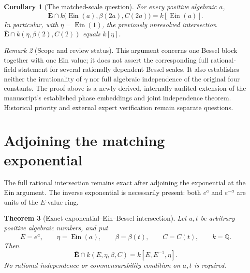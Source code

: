 \documentclass[11pt]{article}
\newtheorem{theorem}{Theorem}[section]
\newtheorem{corollary}[theorem]{Corollary}
\theoremstyle{definition}
\theoremstyle{remark}
\newtheorem{remark}[theorem]{Remark}
\newcommand{\Ein}{\operatorname{Ein}}
\begin{document}
\begin{corollary}[The matched-scale question]\label{fri:matched}
For every positive algebraic $a$,
\[
 \overline{\mathbf E}\cap
 k\bigl(\Ein(a),\beta(2a),C(2a)\bigr)=k[\Ein(a)].
\]
In particular, with $\eta=\Ein(1)$, the previously unresolved
intersection $\overline{\mathbf E}\cap k(\eta,\beta(2),C(2))$
equals $k[\eta]$.
\end{corollary}

\begin{remark}[Scope and review status]
This argument concerns one Bessel block together with one Ein value;
it does not assert the corresponding full rational-field statement
for several rationally dependent Bessel scales.  It also establishes
neither the irrationality of $\gamma$ nor full algebraic independence
of the original four constants.  The proof above is a newly derived,
internally audited extension of the manuscript's established phase
embeddings and joint independence theorem.  Historical priority and
external expert verification remain separate questions.
\end{remark}


\section{Adjoining the matching exponential}
\label{fre:section}

The full rational intersection remains exact after adjoining the
exponential at the Ein argument.  The inverse exponential is necessarily
present: both $e^a$ and $e^{-a}$ are units of the $E$-value ring.

\begin{theorem}[Exact exponential--Ein--Bessel intersection]
\label{fre:main}
Let $a,t$ be arbitrary positive algebraic numbers, and put
\[
 E=e^a,\qquad \eta=\Ein(a),\qquad
 \beta=\beta(t),\qquad C=C(t),\qquad k=\overline{\mathbb Q}.
\]
Then
\begin{equation}\label{fre:main-equation}
 \boxed{\quad
 \overline{\mathbf E}\cap k(E,\eta,\beta,C)
       =k[E,E^{-1},\eta].
 \quad}
\end{equation}
No rational-independence or commensurability condition on $a,t$
is required.
\end{theorem}
\end{document}
